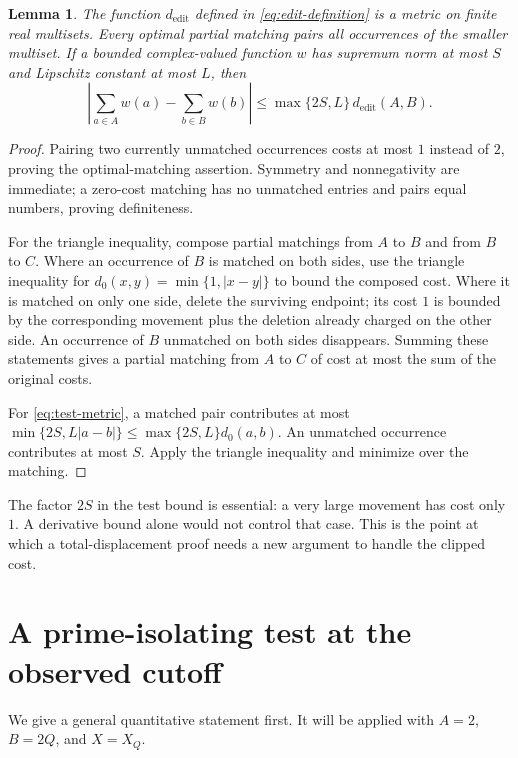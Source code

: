 \documentclass[11pt,letterpaper]{article}
\newtheorem{lemma}[theorem]{Lemma}
\theoremstyle{definition}\newtheorem{definition}[theorem]{Definition}
\theoremstyle{remark}\newtheorem{remark}[theorem]{Remark}
\newcommand{\edit}{d_{\mathrm{edit}}}
\begin{document}
\begin{lemma}\label{lem:metric}
The function $\edit$ defined in \eqref{eq:edit-definition} is a metric on
finite real multisets. Every optimal partial matching pairs all
occurrences of the smaller multiset. If a bounded complex-valued
function $w$ has supremum norm at most $S$ and Lipschitz constant at most
$L$, then
\begin{equation}\label{eq:test-metric}
 \left|\sum_{a\in A}w(a)-\sum_{b\in B}w(b)\right|
 \le\max\{2S,L\}\,\edit(A,B).
\end{equation}
\end{lemma}

\begin{proof}
Pairing two currently unmatched occurrences costs at most $1$ instead
of $2$, proving the optimal-matching assertion. Symmetry and
nonnegativity are immediate; a zero-cost matching has no unmatched
entries and pairs equal numbers, proving definiteness.

For the triangle inequality, compose partial matchings from $A$ to $B$
and from $B$ to $C$. Where an occurrence of $B$ is matched on both
sides, use the triangle inequality for
$d_0(x,y)=\min\{1,|x-y|\}$ to bound the composed cost. Where it is
matched on only one side, delete the surviving endpoint; its cost $1$
is bounded by the corresponding movement plus the deletion already
charged on the other side. An occurrence of $B$ unmatched on both
sides disappears. Summing these statements gives a partial matching
from $A$ to $C$ of cost at most the sum of the original costs.

For \eqref{eq:test-metric}, a matched pair contributes at most
$\min\{2S,L|a-b|\}\le\max\{2S,L\}d_0(a,b)$.
An unmatched occurrence contributes at most $S$.
Apply the triangle inequality and minimize over the matching.
\end{proof}

The factor $2S$ in the test bound is essential: a very large movement
has cost only $1$. A derivative bound alone would not control that
case. This is the point at which a total-displacement proof needs a
new argument to handle the clipped cost.



\section{A prime-isolating test at the observed cutoff}

We give a general quantitative statement first. It will be applied
with $A=2$, $B=2Q$, and $X=X_Q$.
\end{document}
